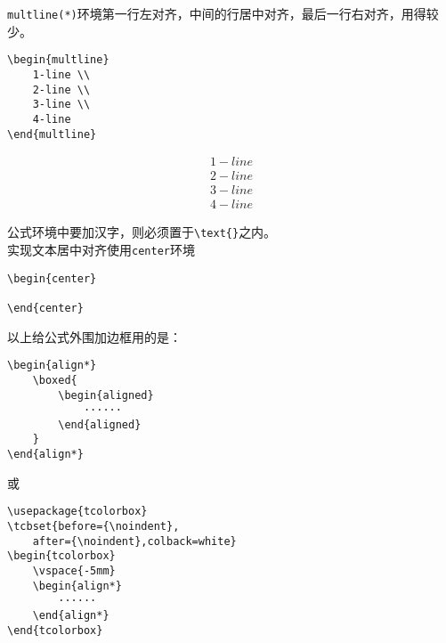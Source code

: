 \documentclass{article}
\begin{document}
\begin{multicols}{2}
\begin{enumerate}
              \verb|multline(*)|环境第一行左对齐，中间的行居中对齐，最后一行右对齐，用得较少。
              \begin{lstlisting}
\begin{multline}
    1-line \\
    2-line \\
    3-line \\
    4-line 
\end{multline}    
\end{lstlisting}
              \begin{tcolorbox}
                  \vspace{-5mm}
                  \begin{multline}
                      1-line \\
                      2-line \\
                      3-line \\
                      4-line
                  \end{multline}
              \end{tcolorbox}
              公式环境中要加汉字，则必须置于\verb|\text{}|之内。\\
              实现文本居中对齐使用\verb|center|环境
              \begin{lstlisting}
\begin{center}

\end{center}
\end{lstlisting}
              以上给公式外围加边框用的是：
              \begin{lstlisting}
\begin{align*}
    \boxed{
        \begin{aligned}
            ······
        \end{aligned} 
    }
\end{align*}
\end{lstlisting}
              或
              \begin{lstlisting}
\usepackage{tcolorbox}
\tcbset{before={\noindent},
    after={\noindent},colback=white}
\begin{tcolorbox}
    \vspace{-5mm}
    \begin{align*}
        ······
    \end{align*} 
\end{tcolorbox}
\end{lstlisting}


\end{enumerate}
\end{multicols}
\end{document}
